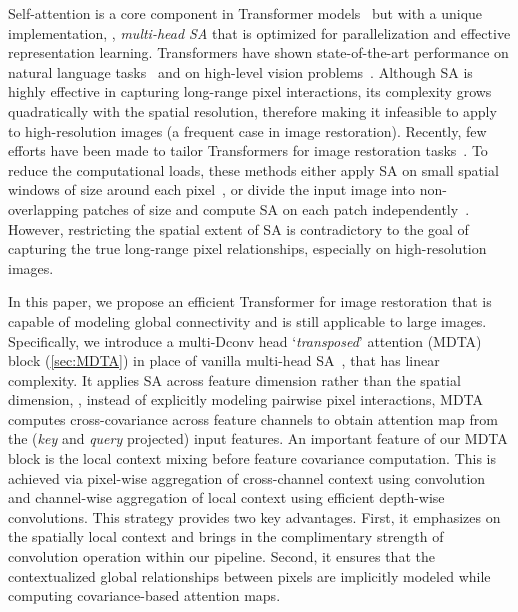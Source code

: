 \documentclass[10pt,twocolumn,letterpaper]{article}
\begin{document}
Self-attention is a core component in Transformer models~\cite{vaswani2017attention,khan2021transformers} but with a unique implementation, \ie, \emph{multi-head SA} that is optimized for parallelization and effective representation learning. Transformers have shown state-of-the-art performance on natural language tasks~\cite{brown2020language,liu2019roberta,radford2018improving,fedus2021switch} and on high-level vision problems~\cite{vision_transformer,touvron2021deit,carion2020end,wang2021pyramid}. 
Although SA is highly effective in capturing long-range pixel interactions, its complexity grows quadratically with the spatial resolution, therefore making it infeasible to apply to high-resolution images (a frequent case in image restoration). 
Recently, few efforts have been made to tailor Transformers for image restoration tasks~\cite{chen2021IPT,liang2021swinir,wang2021uformer}. 
To reduce the computational loads, these methods either apply SA on small spatial windows of size  around each pixel~\cite{liang2021swinir,wang2021uformer}, or divide {the} input image into non-overlapping patches of size  and compute SA on each patch independently~\cite{chen2021IPT}.  
However, restricting the spatial extent of SA is contradictory to the goal of capturing the true long-range pixel relationships, especially on high-resolution images.

In this paper, we propose an efficient Transformer for image restoration that is capable of modeling global connectivity and {is} still applicable to large images. 
Specifically, we introduce a multi-Dconv head `\emph{transposed}' attention (MDTA) block (\cref{sec:MDTA}) in place of vanilla multi-head SA~\cite{vaswani2017attention}, that has linear complexity. It applies SA across feature dimension rather than the spatial dimension, \ie, instead of explicitly modeling pairwise pixel interactions, MDTA computes cross-covariance across feature channels to obtain attention map from the (\emph{key} and \emph{query} projected) input features. 
An important feature of our MDTA block is the local context mixing before feature covariance computation. This is achieved via pixel-wise aggregation of cross-channel context using  convolution and channel-wise aggregation of local context using efficient depth-wise convolutions. This strategy provides two key advantages. 
First, it emphasizes on the spatially local context and brings in the complimentary strength of convolution operation within our pipeline. 
Second, it ensures that the contextualized global relationships between pixels are implicitly modeled while computing covariance-based attention maps.  
\end{document}
